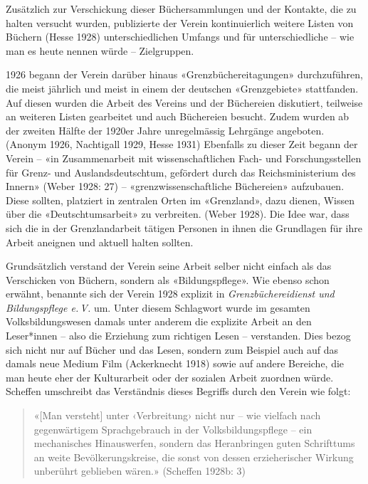 \documentclass[a4paper,
fontsize=11pt,
oneside,
numbers=noperiodatend,
parskip=half-,
bibliography=totoc,
final
]{scrartcl}
\begin{document}
Zusätzlich zur Verschickung dieser Büchersammlungen und der Kontakte,
die zu halten versucht wurden, publizierte der Verein kontinuierlich
weitere Listen von Büchern (Hesse 1928) unterschiedlichen Umfangs und
für unterschiedliche -- wie man es heute nennen würde -- Zielgruppen.

1926 begann der Verein darüber hinaus «Grenzbüchereitagungen»
durchzuführen, die meist jährlich und meist in einem der deutschen
«Grenzgebiete» stattfanden. Auf diesen wurden die Arbeit des Vereins und
der Büchereien diskutiert, teilweise an weiteren Listen gearbeitet und
auch Büchereien besucht. Zudem wurden ab der zweiten Hälfte der 1920er
Jahre unregelmässig Lehrgänge angeboten. (Anonym 1926, Nachtigall 1929,
Hesse 1931) Ebenfalls zu dieser Zeit begann der Verein -- «in
Zusammenarbeit mit wissenschaftlichen Fach- und Forschungsstellen für
Grenz- und Auslandsdeutschtum, gefördert durch das Reichsministerium des
Innern» (Weber 1928: 27) -- «grenzwissenschaftliche Büchereien»
aufzubauen. Diese sollten, platziert in zentralen Orten im «Grenzland»,
dazu dienen, Wissen über die «Deutschtumsarbeit» zu verbreiten. (Weber
1928). Die Idee war, dass sich die in der Grenzlandarbeit tätigen
Personen in ihnen die Grundlagen für ihre Arbeit aneignen und aktuell
halten sollten.

Grundsätzlich verstand der Verein seine Arbeit selber nicht einfach als
das Verschicken von Büchern, sondern als «Bildungspflege». Wie ebenso
schon erwähnt, benannte sich der Verein 1928 explizit in
\emph{Grenzbüchereidienst und Bildungspflege e.\,V.} um. Unter diesem
Schlagwort wurde im gesamten Volksbildungswesen damals unter anderem die
explizite Arbeit an den Leser*innen -- also die Erziehung zum richtigen
Lesen -- verstanden. Dies bezog sich nicht nur auf Bücher und das Lesen,
sondern zum Beispiel auch auf das damals neue Medium Film (Ackerknecht
1918) sowie auf andere Bereiche, die man heute eher der Kulturarbeit
oder der sozialen Arbeit zuordnen würde. Scheffen umschreibt das
Verständnis dieses Begriffs durch den Verein wie folgt:

\begin{quote}
«{[}Man versteht{]} unter ‹Verbreitung› nicht nur -- wie vielfach nach
gegenwärtigem Sprachgebrauch in der Volksbildungspflege -- ein
mechanisches Hinauswerfen, sondern das Heranbringen guten Schrifttums an
weite Bevölkerungskreise, die sonst von dessen erzieherischer Wirkung
unberührt geblieben wären.» (Scheffen 1928b: 3)
\end{quote}
\end{document}
